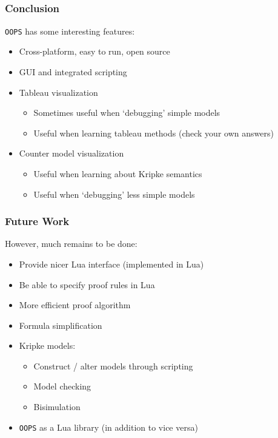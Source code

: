 \documentclass{beamer}
\begin{document}
\subsection{}

\begin{frame}
\frametitle{Conclusion}
{\tt OOPS} has some interesting features:
\begin{itemize}
\item Cross-platform, easy to run, open source
\item GUI and integrated scripting
\item Tableau visualization
	\begin{itemize}
	\item Sometimes useful when `debugging' simple models
	\item Useful when learning tableau methods (check your own answers)
	\end{itemize}
\item Counter model visualization
	\begin{itemize}
	\item Useful when learning about Kripke semantics
	\item Useful when `debugging' less simple models
	\end{itemize}
\end{itemize}
\end{frame}

\begin{frame}
\frametitle{Future Work}
However, much remains to be done:
\begin{itemize}
\item Provide nicer Lua interface (implemented in Lua)
\item Be able to specify proof rules in Lua
\item More efficient proof algorithm
\item Formula simplification
\item Kripke models:
	\begin{itemize}
	\item Construct / alter models through scripting
	\item Model checking
	\item Bisimulation
	\end{itemize}
\item {\tt OOPS} as a Lua library (in addition to vice versa)
\end{itemize}
\end{frame}
\end{document}

